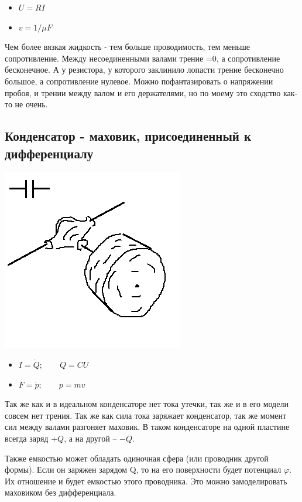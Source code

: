 \documentclass[11pt]{article} %
\begin{document}
\begin{itemize}
\item $U=RI$
\item $v=1/\mu F$
\end{itemize}

Чем более вязкая жидкость - тем больше проводимость, тем меньше сопротивление.
Между несоединенными валами трение =0, а сопротивление бесконечное.
А у резистора, у которого заклинило лопасти трение бесконечно большое, а сопротивление нулевое. 
Можно пофантазировать о напряжении пробоя, и трении между валом и его держателями, но по моему это сходство как-то не очень.

\subsection{Конденсатор - маховик, присоединенный к дифференциалу}

\includegraphics{../C.png}

\begin{itemize}
\item $I=\dot Q; \qquad Q=CU$
\item $F=\dot p; \qquad p=mv$
\end{itemize}

Так же как и в идеальном конденсаторе нет тока утечки, так же и в его модели совсем нет трения.
Так же как сила тока заряжает конденсатор, так же момент сил между валами разгоняет маховик.
В таком конденсаторе на одной пластине всегда заряд $+Q$, а на другой -- $-Q$.

Также емкостью может обладать одиночная сфера (или проводник другой формы). Если он заряжен зарядом Q, то на его поверхности будет потенциал $\varphi$. Их отношение и будет емкостью этого проводника. Это можно замоделировать маховиком без дифференциала.
\end{document}
